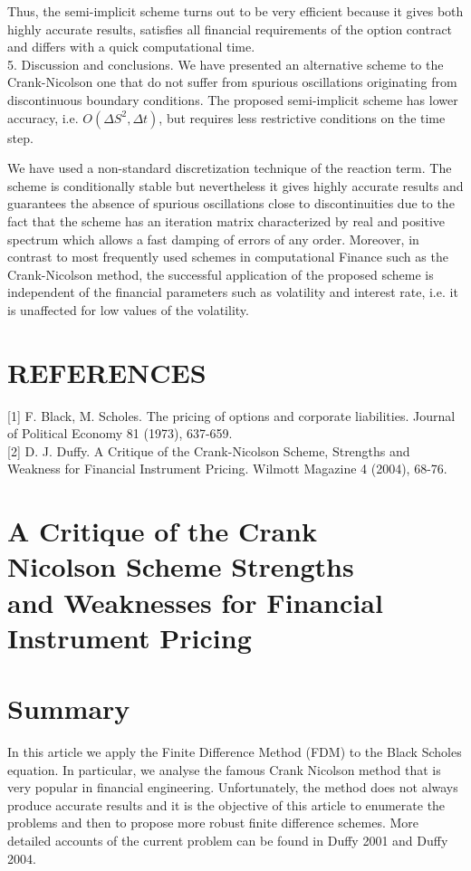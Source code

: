 \documentclass[10pt]{article}
\begin{document}
Thus, the semi-implicit scheme turns out to be very efficient because it gives both highly accurate results, satisfies all financial requirements of the option contract and differs with a quick computational time.\\
5. Discussion and conclusions. We have presented an alternative scheme to the Crank-Nicolson one that do not suffer from spurious oscillations originating from discontinuous boundary conditions. The proposed semi-implicit scheme has lower accuracy, i.e. $O\left(\Delta S^{2}, \Delta t\right)$, but requires less restrictive conditions on the time step.

We have used a non-standard discretization technique of the reaction term. The scheme is conditionally stable but nevertheless it gives highly accurate results and guarantees the absence of spurious oscillations close to discontinuities due to the fact that the scheme has an iteration matrix characterized by real and positive spectrum which allows a fast damping of errors of any order. Moreover, in contrast to most frequently used schemes in computational Finance such as the Crank-Nicolson method, the successful application of the proposed scheme is independent of the financial parameters such as volatility and interest rate, i.e. it is unaffected for low values of the volatility.

\section*{REFERENCES}
[1] F. Black, M. Scholes. The pricing of options and corporate liabilities. Journal of Political Economy 81 (1973), 637-659.\\[0pt]
[2] D. J. Duffy. A Critique of the Crank-Nicolson Scheme, Strengths and Weakness for Financial Instrument Pricing. Wilmott Magazine 4 (2004), 68-76.

\section*{A Critique of the Crank \\
 Nicolson Scheme Strengths \\
 and Weaknesses for Financial Instrument Pricing }


\section*{Summary}
In this article we apply the Finite Difference Method (FDM) to the Black Scholes equation. In particular, we analyse the famous Crank Nicolson method that is very popular in financial engineering. Unfortunately, the method does not always produce accurate results and it is the objective of this article to enumerate the problems and then to propose more robust finite difference schemes. More detailed accounts of the current problem can be found in Duffy 2001 and Duffy 2004.
\end{document}
